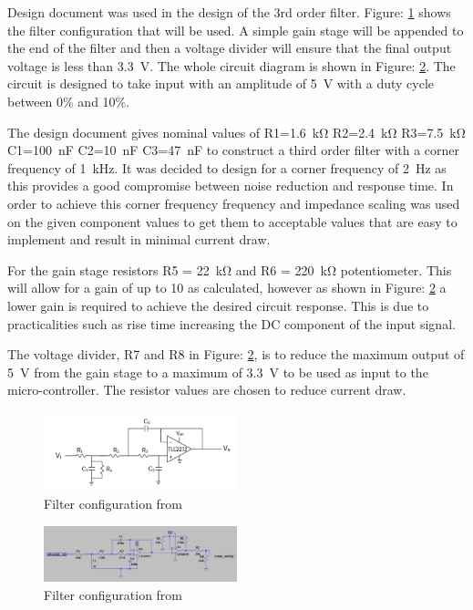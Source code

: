 Design document \cite{Design_SonicSens_Filter} was used in the design of the 3rd order filter. Figure: \ref{fig:sonicsens_filter} shows the filter configuration that will be used. A simple gain stage will be appended to the end of the filter and then a voltage divider will ensure that the final output voltage is less than \SI{3.3}{\volt}. The whole circuit diagram is shown in Figure: \ref{fig:sonicsens_diag}. The circuit is designed to take input with an amplitude of \SI{5}{\volt} with a duty cycle between 0\% and 10\%.

The design document gives nominal values of R1=\SI{1.6}{\kilo\ohm} R2=\SI{2.4}{\kilo\ohm}  R3=\SI{7.5}{\kilo\ohm} C1=\SI{100}{\nano\farad} C2=\SI{10}{\nano\farad} C3=\SI{47}{\nano\farad} to construct a third order filter with a  corner frequency of \SI{1}{\kilo\hertz}. It was decided to design for a corner frequency of \SI{2}{\hertz} as this provides a good compromise between noise reduction and response time. In order to achieve this corner frequency frequency and impedance scaling was used on the given component values to get them to acceptable values that are easy to implement and result in minimal current draw. 


For the gain stage resistors R5 = \SI{22}{\kilo\ohm} and R6 = \SI{220}{\kilo\ohm} potentiometer. This will allow for a gain of up to 10 as calculated, however as shown in Figure: \ref{fig:sonicsens_diag} a lower gain is required to achieve the desired circuit response. This is due to practicalities such as rise time increasing the DC component of the input signal.


The voltage divider, R7 and R8 in Figure: \ref{fig:sonicsens_diag}, is to reduce the maximum output of \SI{5}{\volt} from the gain stage to a maximum of \SI{3.3}{\volt} to be used as input to the micro-controller. The resistor values are chosen to reduce current draw.

\begin{figure}
\centering
\includegraphics[width=0.5\textwidth]{./Figures/SonicSens_Filter.png}
\caption{Filter configuration from \cite{Design_SonicSens_Filter}}
\label{fig:sonicsens_filter}
\end{figure}

\begin{figure}
\centering
\includegraphics[width=0.5\textwidth]{./Figures/SonicSens_Diagram.png}
\caption{Filter configuration from \cite{Design_SonicSens_Filter}}
\label{fig:sonicsens_diag}
\end{figure}







